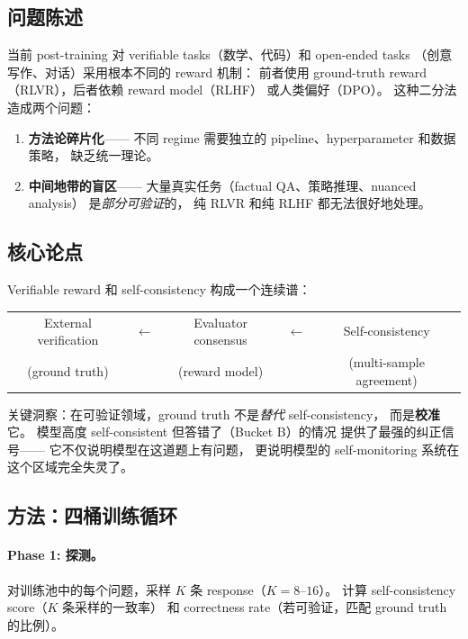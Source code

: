 \documentclass[12pt,a4paper]{article}
\begin{document}
\subsection{问题陈述}

当前 post-training 对 verifiable tasks（数学、代码）和 open-ended tasks
（创意写作、对话）采用根本不同的 reward 机制：
前者使用 ground-truth reward（RLVR），后者依赖 reward model（RLHF）
或人类偏好（DPO）。
这种二分法造成两个问题：

\begin{enumerate}[leftmargin=2em]
  \item \textbf{方法论碎片化}——
    不同 regime 需要独立的 pipeline、hyperparameter 和数据策略，
    缺乏统一理论。
  \item \textbf{中间地带的盲区}——
    大量真实任务（factual QA、策略推理、nuanced analysis）
    是\textit{部分可验证}的，
    纯 RLVR 和纯 RLHF 都无法很好地处理。
\end{enumerate}

\subsection{核心论点}

Verifiable reward 和 self-consistency 构成一个连续谱：

\begin{center}
\begin{tabular}{ccccc}
External verification & $\longleftarrow$ & Evaluator consensus & $\longleftarrow$ & Self-consistency \\
\small{(ground truth)} & & \small{(reward model)} & & \small{(multi-sample agreement)}
\end{tabular}
\end{center}

\noindent
关键洞察：在可验证领域，ground truth 不是\textit{替代} self-consistency，
而是\textbf{校准}它。
模型高度 self-consistent 但答错了（Bucket B）的情况
提供了最强的纠正信号——
它不仅说明模型在这道题上有问题，
更说明模型的 self-monitoring 系统在这个区域完全失灵了。

\subsection{方法：四桶训练循环}

\paragraph{Phase 1: 探测。}
对训练池中的每个问题，采样 $K$ 条 response（$K = 8\text{--}16$）。
计算 self-consistency score（$K$ 条采样的一致率）
和 correctness rate（若可验证，匹配 ground truth 的比例）。
\end{document}
